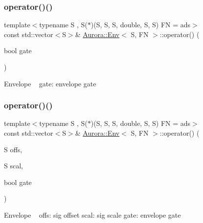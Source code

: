 \subsubsection{\texorpdfstring{operator()()}{operator()()}\hspace{0.1cm}{\footnotesize\ttfamily [4/6]}}
{\footnotesize\ttfamily template$<$typename S , S($\ast$)(\+S, S, S, double, S, S) FN = ads$>$ \\
const std\+::vector$<$S$>$\& \hyperlink{class_aurora_1_1_env}{Aurora\+::\+Env}$<$ S, FN $>$\+::operator() (\begin{DoxyParamCaption}\item[{bool}]{gate }\end{DoxyParamCaption})\hspace{0.3cm}{\ttfamily [inline]}}

Envelope ~\newline
gate\+: envelope gate \mbox{\label{class_aurora_1_1_env_a664e3c6ce7e66de66305ab220c116792}} 
\subsubsection{\texorpdfstring{operator()()}{operator()()}\hspace{0.1cm}{\footnotesize\ttfamily [5/6]}}
{\footnotesize\ttfamily template$<$typename S , S($\ast$)(\+S, S, S, double, S, S) FN = ads$>$ \\
const std\+::vector$<$S$>$\& \hyperlink{class_aurora_1_1_env}{Aurora\+::\+Env}$<$ S, FN $>$\+::operator() (\begin{DoxyParamCaption}\item[{S}]{offs,  }\item[{S}]{scal,  }\item[{bool}]{gate }\end{DoxyParamCaption})\hspace{0.3cm}{\ttfamily [inline]}}

Envelope ~\newline
offs\+: sig offset scal\+: sig scale gate\+: envelope gate \mbox{\label{class_aurora_1_1_env_a577d95d24fd9f5c5796210874623c650}} 
